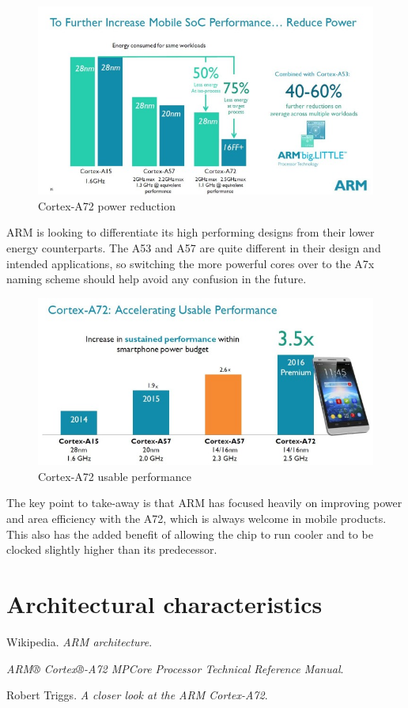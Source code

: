 \documentclass[12pt]{article}
\begin{document}
\begin{figure}[H]
\begin{center}
\includegraphics[width=0.8\linewidth]{imgs/foto3.jpg}
\caption{Cortex-A72 power reduction}
\label{cortexA72power}
\end{center}
\end{figure}

ARM is looking to differentiate its high performing designs from their lower energy counterparts. The A53 and A57 are quite different in their design and intended applications, so switching the more powerful cores over to the A7x naming scheme should help avoid any confusion in the future.\cite{androidauthority}

\begin{figure}[H]
\begin{center}
\includegraphics[width=0.8\linewidth]{imgs/foto4.jpg}
\caption{Cortex-A72 usable performance}
\label{cortexA72usable}
\end{center}
\end{figure}

The key point to take-away is that ARM has focused heavily on improving power and area efficiency with the A72, which is always welcome in mobile products. This also has the added benefit of allowing the chip to run cooler and to be clocked slightly higher than its predecessor.\cite{androidauthority}

\section{Architectural characteristics}

\begin{thebibliography}{9}
Wikipedia.
\textit{ARM architecture}. 

 
\textit{ARM® Cortex®-A72 MPCore Processor Technical Reference Manual}.

 
Robert Triggs. \textit{A closer look at the ARM Cortex-A72}.

\end{thebibliography}
\end{document}
